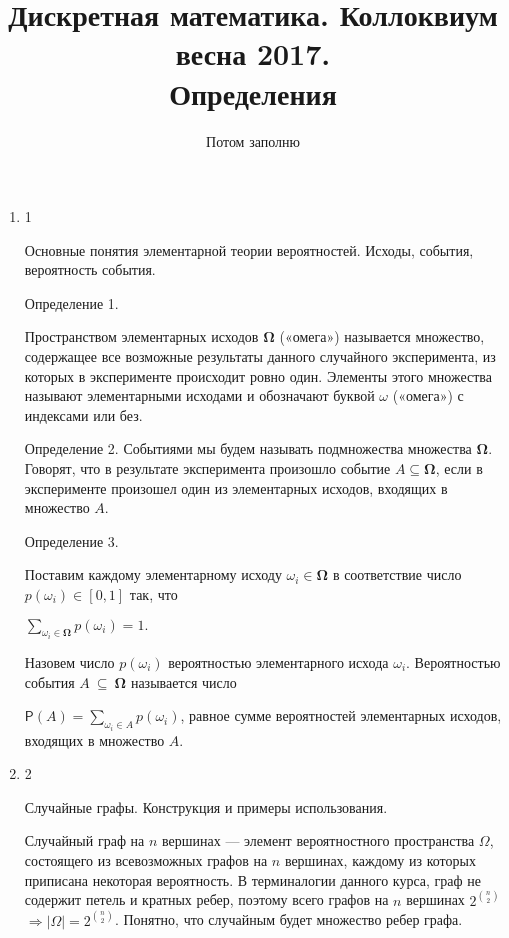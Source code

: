 \documentclass[a4paper,12pt]{article}
\begin{document}
	\title{Дискретная математика. Коллоквиум весна 2017.\\ Определения}
	\author{Потом заполню}
	\maketitle
	
	\begin{enumerate}
	
	 \item 1
    
    Основные понятия элементарной теории вероятностей. Исходы, события, вероятность события.

	Определение 1.
    
	Пространством элементарных исходов   ${\mathbf \Omega}$ («омега») называется множество, содержащее все возможные результаты 	данного случайного эксперимента, из которых в эксперименте происходит ровно один. Элементы этого множества называют элементарными исходами  и обозначают буквой $\omega$ («омега») с индексами или без.

	Определение 2.
	Событиями  мы будем называть подмножества множества ${\mathbf \Omega}$. Говорят, что в результате эксперимента произошло событие  	$A\subseteq \mathbf \Omega$, если в эксперименте произошел один из элементарных исходов, входящих в множество $A$.

	Определение 3.

	Поставим каждому элементарному исходу  $\omega_i\in \mathbf\Omega$ в соответствие число  $p (\omega_i)\in [0,1]$ так, что

	$\sum_{\omega_i\in \mathbf\Omega} p(\omega_i) =1.$

	Назовем число $p (\omega_i)$ вероятностью  элементарного исхода $\omega_i$. Вероятностью  события $A~\subseteq~\mathbf\Omega$ 	называется число

	${\mathsf P}(A) = \sum_{\omega_i\in A} p(\omega_i)$,
	равное сумме вероятностей элементарных исходов, входящих в множество $A$.
	
    \item 2

    Случайные графы. Конструкция и примеры использования.

    Случайный граф на $n$ вершинах --- элемент вероятностного пространства $\Omega$, состоящего из всевозможных графов на $n$ вершинах, каждому из которых приписана некоторая вероятность. В терминалогии данного курса, граф не содержит петель и кратных ребер, поэтому всего графов на $n$ вершинах $2^{n \choose 2}$ $\Rightarrow |\Omega| = 2^{n \choose 2}$. Понятно, что случайным будет множество ребер графа.


\end{enumerate}
\end{document}
